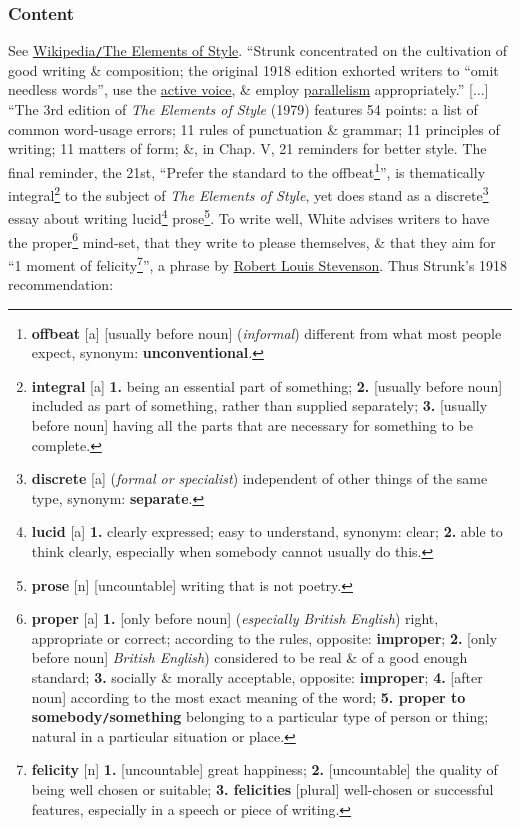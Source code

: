 \documentclass{article}
\begin{document}
\subsubsection{Content}
See \href{https://en.wikipedia.org/wiki/The_Elements_of_Style}{Wikipedia{\tt/}The Elements of Style}. ``Strunk concentrated on the cultivation of good writing \& composition; the original 1918 edition exhorted writers to ``omit needless words'', use the \href{https://en.wikipedia.org/wiki/Active_voice}{active voice}, \& employ \href{https://en.wikipedia.org/wiki/Parallelism_(grammar)}{parallelism} appropriately.'' [$\ldots$] ``The 3rd edition of {\it The Elements of Style} (1979) features 54 points: a list of common word-usage errors; 11 rules of punctuation \& grammar; 11 principles of writing; 11 matters of form; \&, in Chap. V, 21 reminders for better style. The final reminder, the 21st, ``Prefer the standard to the offbeat\footnote{{\bf offbeat} [a] [usually before noun] ({\it informal}) different from what most people expect, {\sc synonym}: {\bf unconventional}.}'', is thematically integral\footnote{{\bf integral} [a] {\bf 1.} being an essential part of something; {\bf 2.} [usually before noun] included as part of something, rather than supplied separately; {\bf 3.} [usually before noun] having all the parts that are necessary for something to be complete.} to the subject of {\it The Elements of Style}, yet does stand as a discrete\footnote{{\bf discrete} [a] ({\it formal or specialist}) independent of other things of the same type, {\sc synonym}: {\bf separate}.} essay about writing lucid\footnote{{\bf lucid} [a] {\bf 1.} clearly expressed; easy to understand, {\sc synonym}: clear; {\bf 2.} able to think clearly, especially when somebody cannot usually do this.} prose\footnote{{\bf prose} [n] [uncountable] writing that is not poetry.}. To write well, White advises writers to have the proper\footnote{{\bf proper} [a] {\bf 1.} [only before noun] ({\it especially British English}) right, appropriate or correct; according to the rules, {\sc opposite}: {\bf improper}; {\bf 2.} [only before noun] {\it British English}) considered to be real \& of a good enough standard; {\bf 3.} socially \& morally acceptable, {\sc opposite}: {\bf improper}; {\bf 4.} [after noun] according to the most exact meaning of the word; {\bf 5. proper to somebody{\tt/}something} belonging to a particular type of person or thing; natural in a particular situation or place.} mind-set, that they write to please themselves, \& that they aim for ``1 moment of felicity\footnote{{\bf felicity} [n] {\bf 1.} [uncountable] great happiness; {\bf 2.} [uncountable] the quality of being well chosen or suitable; {\bf 3. felicities} [plural] well-chosen or successful features, especially in a speech or piece of writing.}'', a phrase by \href{https://en.wikipedia.org/wiki/Robert_Louis_Stevenson}{Robert Louis Stevenson}. Thus Strunk's 1918 recommendation:
\end{document}
